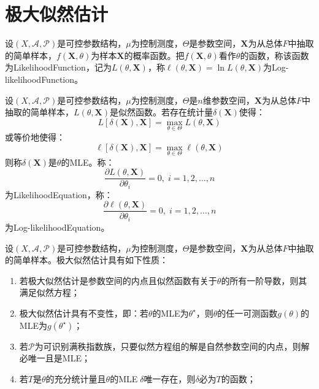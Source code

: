 \section{极大似然估计}

\begin{definition}
	设$(X,\mathscr{A},\mathscr{P})$是可控参数结构，$\mu$为控制测度，$\Theta$是参数空间，$\mathbf{X}$为从总体$F$中抽取的简单样本，$f(\mathbf{X},\theta)$为样本$\mathbf{X}$的概率函数。把$f(\mathbf{X},\theta)$看作$\theta$的函数，称该函数为\gls{LikelihoodFunction}，记为$L(\theta,\mathbf{X})$，称$\ell(\theta,\mathbf{X})=\ln L(\theta,\mathbf{X})$为\gls{Log-likelihoodFunction}。
\end{definition}
\begin{definition}
	设$(X,\mathscr{A},\mathscr{P})$是可控参数结构，$\mu$为控制测度，$\Theta$是$n$维参数空间，$\mathbf{X}$为从总体$F$中抽取的简单样本，$L(\theta,\mathbf{X})$是似然函数。若存在统计量$\delta(\mathbf{X})$使得：
	\begin{equation*}
		L[\delta(\mathbf{X}),\mathbf{X}]=\max_{\theta\in\Theta}L(\theta,\mathbf{X})
	\end{equation*}
	或等价地使得：
	\begin{equation*}
		\ell[\delta(\mathbf{X}),\mathbf{X}]=\max_{\theta\in\Theta}\ell(\theta,\mathbf{X})
	\end{equation*}
	则称$\delta(\mathbf{X})$是$\theta$的\gls{MLE}。称：
	\begin{equation*}
		\frac{\partial L(\theta,\mathbf{X})}{\partial\theta_i}=0,\; i=1,2,\dots,n
	\end{equation*}
	为\gls{LikelihoodEquation}，称：
	\begin{equation*}
		\frac{\partial \ell(\theta,\mathbf{X})}{\partial\theta_i}=0,\; i=1,2,\dots,n
	\end{equation*}
	为\gls{Log-likelihoodEquation}。
\end{definition}
\begin{property}\label{prop:MLE}
	设$(X,\mathscr{A},\mathscr{P})$是可控参数结构，$\mu$为控制测度，$\Theta$是参数空间，$\mathbf{X}$为从总体$F$中抽取的简单样本。极大似然估计具有如下性质：
	\begin{enumerate}
		\item 若极大似然估计是参数空间的内点且似然函数有关于$\theta$的所有一阶导数，则其满足似然方程；
		\item 极大似然估计具有不变性，即：若$\theta$的MLE为$\theta^{\star}$，则$\theta$的任一可测函数$g(\theta)$的MLE为$g(\theta^{\star})$；
		\item 若$\mathscr{P}$为可识别满秩指数族，只要似然方程组的解是自然参数空间的内点，则解必唯一且是MLE；
		\item 若$T$是$\theta$的充分统计量且$\theta$的MLE$\;\delta$唯一存在，则$\delta$必为$T$的函数；
	\end{enumerate}
\end{property}
